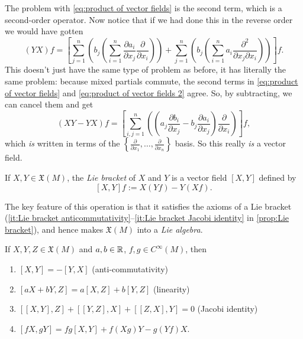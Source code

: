 The problem with \eqref{eq:product of vector fields} is the second term, which is a second-order operator. Now notice that if we had done this in the reverse order we would have gotten
\begin{equation}\label{eq:product of vector fields 2}
	(YX)f = \left[ \sum_{j=1}^n \left(b_j \left( \sum_{i=1}^n \frac{\partial a_i}{\partial x_j} \frac{\partial}{\partial x_i}\right)\right) + \sum_{j=1}^n \left(b_j \left(\sum_{i=1}^n a_i \frac{\partial^2}{\partial x_j \partial x_i}\right)\right)\right]f.
\end{equation}
This doesn't just have the same type of problem as before, it has literally the same problem: because mixed partials commute, the second terms in \eqref{eq:product of vector fields} and \eqref{eq:product of vector fields 2} agree. So, by subtracting, we can cancel them and get
\begin{equation}\label{eq:Lie bracket in local coords}
	(XY - YX)f = \left[\sum_{i,j=1}^n \left(\left( a_j \frac{\partial b_i}{\partial x_j} - b_j \frac{\partial a_i}{\partial x_j}\right)\frac{\partial}{\partial x_i}\right)\right]f,
\end{equation}
which \emph{is} written in terms of the $\left\{ \frac{\partial}{\partial x_1}, \dots , \frac{\partial}{\partial x_n}\right\}$ basis. So this really \emph{is} a vector field.

\begin{definition}\label{def:Lie bracket of vector fields}
	If $X,Y \in \mathfrak{X}(M)$, the \emph{Lie bracket} of $X$ and $Y$ is a vector field $[X,Y]$ defined by
	\[
		[X,Y]f := X(Yf)-Y(Xf).
	\]
\end{definition}

The key feature of this operation is that it satisfies the axioms of a Lie bracket (\ref{it:Lie bracket anticommutativity}--\ref{it:Lie bracket Jacobi identity} in \cref{prop:Lie bracket}), and hence makes $\mathfrak{X}(M)$ into a \emph{Lie algebra}.

\begin{proposition}\label{prop:Lie bracket}
	If $X,Y,Z \in \mathfrak{X}(M)$ and $a,b \in \mathbb{R}$, $f, g \in C^\infty(M)$, then
	\begin{enumerate}
		\item \label{it:Lie bracket anticommutativity} $[X,Y]=-[Y,X]$ (anti-commutativity)
		\item \label{it:Lie bracket linearity} $[aX+bY,Z]=a[X,Z]+b[Y,Z]$ (linearity)
		\item \label{it:Lie bracket Jacobi identity} $[[X,Y],Z]+[[Y,Z],X]+[[Z,X],Y]=0$ (Jacobi identity)
		\item $[fX,gY]=fg[X,Y]+f(Xg)Y-g(Yf)X$.
	\end{enumerate}
\end{proposition}

